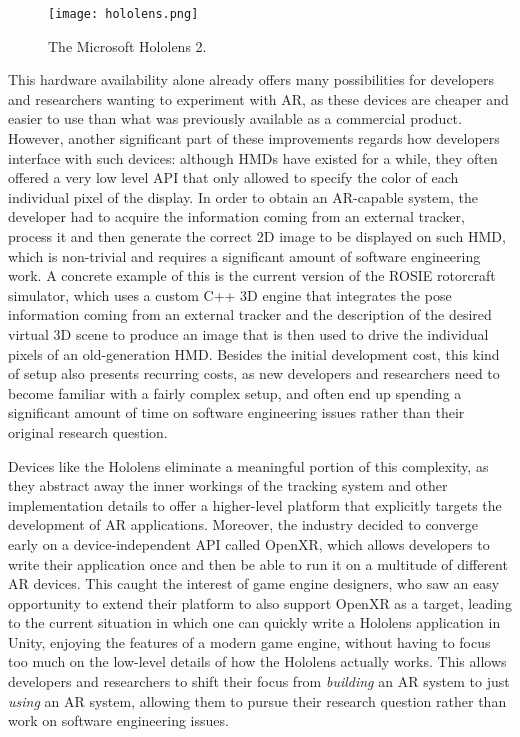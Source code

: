 \begin{figure}
  \centering
  \texttt{[image: hololens.png]}
  \caption{The Microsoft Hololens 2.}\label{fig:hololens_image}
\end{figure}

This hardware availability alone already offers many possibilities for developers and researchers wanting to experiment with \gls{AR}, as these devices are cheaper and easier to use than what was previously available as a commercial product. However, another significant part of these improvements regards how developers interface with such devices: although \glspl{HMD} have existed for a while, they often offered a very low level \gls{API} that only allowed to specify the color of each individual pixel of the display. In order to obtain an AR-capable system, the developer had to acquire the information coming from an external tracker, process it and then generate the correct 2D image to be displayed on such \gls{HMD}, which is non-trivial and requires a significant amount of software engineering work. A concrete example of this is the current version of the ROSIE\cite{viertler_requirements_2015} rotorcraft simulator, which uses a custom C++ 3D engine that integrates the pose information coming from an external tracker and the description of the desired virtual 3D scene to produce an image that is then used to drive the individual pixels of an old-generation \gls{HMD}. Besides the initial development cost, this kind of setup also presents recurring costs, as new developers and researchers need to become familiar with a fairly complex setup, and often end up spending a significant amount of time on software engineering issues rather than their original research question.

Devices like the Hololens eliminate a meaningful portion of this complexity, as they abstract away the inner workings of the tracking system and other implementation details to offer a higher-level platform that explicitly targets the development of \gls{AR} applications. Moreover, the industry decided to converge early on a device-independent \gls{API} called OpenXR\cite{world_wide_web_consortium_webxr_nodate}, which allows developers to write their application once and then be able to run it on a multitude of different \gls{AR} devices. This caught the interest of game engine designers, who saw an easy opportunity to extend their platform to also support OpenXR as a target, leading to the current situation in which one can quickly write a Hololens application in Unity, enjoying the features of a modern game engine, without having to focus too much on the low-level details of how the Hololens actually works. This allows developers and researchers to shift their focus from \emph{building} an \gls{AR} system to just \emph{using} an \gls{AR} system, allowing them to pursue their research question rather than work on software engineering issues.

